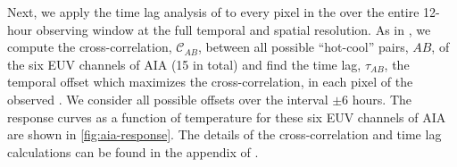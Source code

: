 Next, we apply the time lag analysis of \citet{viall_evidence_2012} to every pixel in the \AR{} over the entire 12-hour observing window at the full temporal and spatial resolution.
As in , we compute the cross-correlation, $\mathcal{C}_{AB}$, between all possible ``hot-cool'' pairs, $AB$, of the six EUV channels of AIA (15 in total) and find the time lag, $\tau_{AB}$, the temporal offset which maximizes the cross-correlation, in each pixel of the observed \AR{}.
We consider all possible offsets over the interval $\pm6$ hours.
The response curves as a function of temperature for these six EUV channels of AIA are shown in \autoref{fig:aia-response}.
The details of the cross-correlation and time lag calculations can be found in the appendix of .

